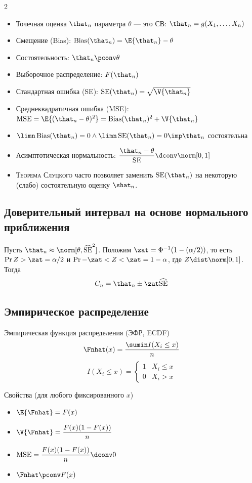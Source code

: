\documentclass[landscape]{article}
\def\bias{\ensuremath{\operatorname{Bias}}\xspace}
\def\se{\ensuremath{\operatorname{SE}}\xspace}
\def\sehat{\ensuremath{\widehat{\mathrm{SE}}}}
\def\mse{\ensuremath{\operatorname{MSE}}\xspace}
\renewcommand{\rv}{СВ\xspace}
\begin{document}
\begin{multicols*}{2}
\begin{itemize}
  \item Точечная оценка $\that_n$ параметра $\theta$ — это \rv:
    $\that_n = g(X_1,\dots,X_n)$
  \item Смещение (Bias): $\bias(\that_n) = \E{\that_n}-\theta$
  \item Состоятельность: $\that_n \pconv \theta$
  \item Выборочное распределение: $F(\that_n)$
  \item Стандартная ошибка (SE): $\se(\that_n) = \sqrt{\V{\that_n}}$
  \item Среднеквадратичная ошибка (MSE):\\
    $\mse = \E{(\that_n-\theta)^2}
    = \bias(\that_n)^2 + \V{\that_n}$
  \item $\limn \bias(\that_n) = 0 \wedge \limn\se(\that_n) = 0
    \imp \that_n$ состоятельна
  \item Асимптотическая нормальность:
    $\displaystyle\frac{\that_n-\theta}{\se} \dconv \norm[0,1]$
  \item \textsc{Теорема Слуцкого} часто позволяет заменить $\se(\that_n)$ на некоторую
    (слабо) состоятельную оценку $\shat_n$.
\end{itemize}

\subsection{Доверительный интервал на основе нормального приближения}

Пусть $\that_n \approx \norm[\theta,\sehat^2]$.
Положим $\zat = \Phi^{-1}(1-(\alpha/2))$,
то есть $\Pr{Z > \zat} = \alpha/2$ и $\Pr{-\zat < Z < \zat} = 1-\alpha$,
где $Z\dist\norm[0,1]$.
Тогда \[C_n = \that_n \pm \zat\sehat\]

\subsection{Эмпирическое распределение}

Эмпирическая функция распределения (ЭФР, ECDF)
\[\Fnhat(x) = \displaystyle\frac{\sumin I(X_i \le x)}{n}\]
\[I(X_i \le x) = \begin{cases}
  1 & X_i \le x \\
  0 & X_i > x
\end{cases}\]

Свойства (для любого фиксированного $x$)
\begin{itemize}
  \item $\E{\Fnhat} = F(x)$
  \item $\V{\Fnhat} = \displaystyle\frac{F(x)(1-F(x))}{n}$
  \item $\mse = \displaystyle\frac{F(x)(1-F(x))}{n} \dconv 0$
  \item $\Fnhat \pconv F(x)$
\end{itemize}


\end{multicols*}
\end{document}
